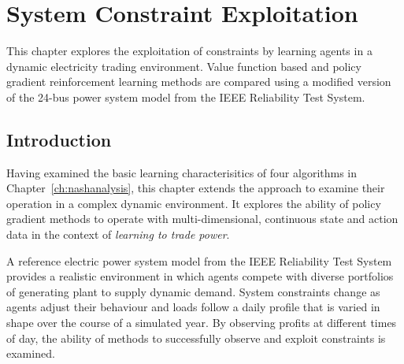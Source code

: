 \chapter{System Constraint Exploitation}
\label{ch:exploitation}
This chapter explores the exploitation of constraints by learning agents in a
dynamic electricity trading environment.  Value function based and policy
gradient reinforcement learning methods are compared using a modified version
of the 24-bus power system model from the IEEE Reliability Test System.

\section{Introduction}
Having examined the basic learning characterisitics of four algorithms in
Chapter~\ref{ch:nashanalysis}, this chapter extends the approach to examine
their operation in a complex dynamic environment.  It explores the ability of
policy gradient methods to operate with multi-dimensional, continuous state and
action data in the context of \textit{learning to trade power}.

A reference electric power system model from the IEEE Reliability Test System
\cite{ieee79rts} provides a realistic environment in which agents compete with
diverse portfolios of generating plant to supply dynamic demand.  System
constraints change as agents adjust their behaviour and loads follow a daily
profile that is varied in shape over the course of a simulated year.  By
observing profits at different times of day, the ability of methods to
successfully observe and exploit constraints is examined.

